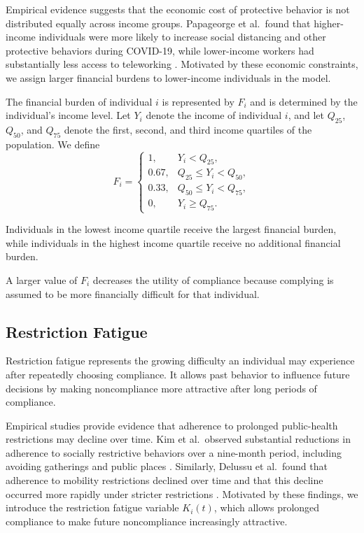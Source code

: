 \documentclass[11pt]{article}
\theoremstyle{definition}
\theoremstyle{plain}
\begin{document}
Empirical evidence suggests that the economic cost of protective behavior
is not distributed equally across income groups. Papageorge et al.\ found
that higher-income individuals were more likely to increase social distancing
and other protective behaviors during COVID-19, while lower-income workers
had substantially less access to teleworking \cite{papageorge2021}.
Motivated by these economic constraints, we assign larger financial burdens
to lower-income individuals in the model.

The financial burden of individual $i$ is represented by $F_i$ and is determined by the individual's income level. Let $Y_i$ denote the income of individual $i$, and let $Q_{25}$, $Q_{50}$, and $Q_{75}$ denote the first, second, and third income quartiles of the population. We define
\[
F_i=
\begin{cases}
1, & Y_i<Q_{25},\\
0.67, & Q_{25}\leq Y_i<Q_{50},\\
0.33, & Q_{50}\leq Y_i<Q_{75},\\
0, & Y_i\geq Q_{75}.
\end{cases}
\]

Individuals in the lowest income quartile receive the largest financial burden, while individuals in the highest income quartile receive no additional financial burden.

A larger value of $F_i$ decreases the utility of compliance because complying is assumed to be more financially difficult for that individual.

\subsection{Restriction Fatigue}
\label{sec:fatigue}

Restriction fatigue represents the growing difficulty an individual may experience after repeatedly choosing compliance. It allows past behavior to influence future decisions by making noncompliance more attractive after long periods of compliance.

Empirical studies provide evidence that adherence to prolonged public-health
restrictions may decline over time. Kim et al.\ observed substantial reductions
in adherence to socially restrictive behaviors over a nine-month period,
including avoiding gatherings and public places \cite{kim2023}. Similarly,
Delussu et al.\ found that adherence to mobility restrictions declined over
time and that this decline occurred more rapidly under stricter restrictions
\cite{delussu2022}. Motivated by these findings, we introduce the restriction
fatigue variable $K_i(t)$, which allows prolonged compliance to make future
noncompliance increasingly attractive.
\end{document}

